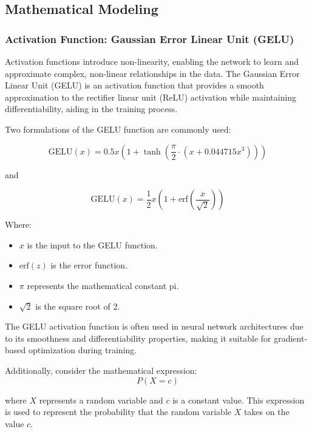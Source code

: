 \subsection{Mathematical Modeling}

\subsubsection{Activation Function: Gaussian Error Linear Unit (GELU)}
Activation functions introduce non-linearity, enabling the network to learn and approximate complex, non-linear relationships in the data. The Gaussian Error Linear Unit (GELU) is an activation function that provides a smooth approximation to the rectifier linear unit (ReLU) activation while maintaining differentiability, aiding in the training process.

Two formulations of the GELU function are commonly used:

\begin{equation}
    \text{GELU}(x) = 0.5x \left(1 + \tanh\left(\frac{\pi}{2} \cdot \left(x + 0.044715x^3\right)\right)\right) \label{eq:gelu}
\end{equation}

and

\begin{equation}
    \text{GELU}(x) = \frac{1}{2}x \left(1 + \text{erf}\left(\frac{x}{\sqrt{2}}\right)\right) \label{eq:gelu2}
\end{equation}

Where:
\begin{itemize}
    \item $x$ is the input to the GELU function.
    \item $\text{erf}(z)$ is the error function.
    \item $\pi$ represents the mathematical constant pi.
    \item $\sqrt{2}$ is the square root of 2.
\end{itemize}

The GELU activation function is often used in neural network architectures due to its smoothness and differentiability properties, making it suitable for gradient-based optimization during training.

Additionally, consider the mathematical expression:
\begin{equation}
    P(X = c) \label{eq:probability}
\end{equation}

where $X$ represents a random variable and $c$ is a constant value. This expression is used to represent the probability that the random variable $X$ takes on the value $c$.\\

